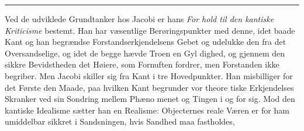 \documentclass[12pt,a4paper]{book}
\newcommand{\divrule}{\begin{center}\rule{2cm}{0.4pt}\end{center}}
\begin{document}
\divrule

Ved de udviklede Grundtanker hos Jacobi er hans \emph{For\-%
hold til den kantiske Kriticisme} bestemt. Han har
væsentlige Berøringspunkter med denne, idet baade Kant og
han begrændse Forstandserkjendelsens Gebet og udelukke den
fra det Oversandselige, og idet de begge hævde Troen en Gyl\-%
dighed, og gjennem den sikkre Bevidstheden det Høiere, som
Fornuften fordrer, men Forstanden ikke begriber. Men Jacobi
skiller sig fra Kant i tre Hovedpunkter. Han misbilliger for
det Første den Maade, paa hvilken Kant begrunder vor theore\-%
tiske Erkjendelses Skranker ved sin Sondring mellem Phæno\-%
menet og Tingen i og for sig. Mod den kantiske Idealisme
sætter han en Realisme: Objecternes reale Væren er for ham
umiddelbar sikkret i Sandsningen, hvis Sandhed maa fastholdes,
\end{document}
